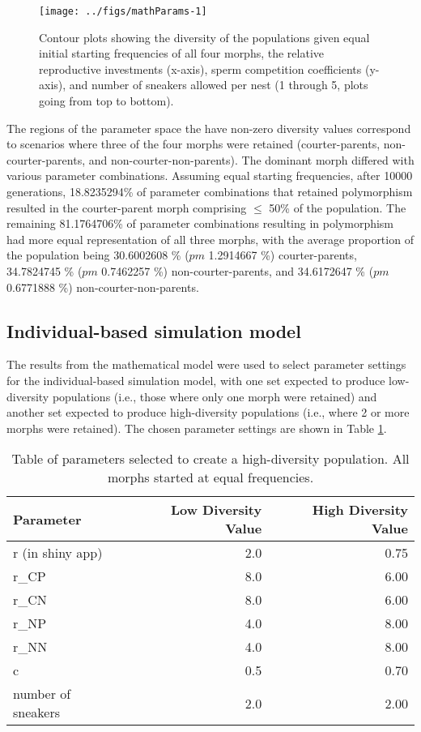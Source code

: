 \documentclass[
  11pt,
]{article}
\begin{document}
\begin{figure}[H]
\texttt{[image: ../figs/mathParams-1]} \caption{Contour plots showing the diversity of the populations given equal initial starting frequencies of all four morphs, the relative reproductive investments (x-axis), sperm competition coefficients (y-axis), and number of sneakers allowed per nest (1 through 5, plots going from top to bottom).}\label{fig:mathParams}
\end{figure}

The regions of the parameter space the have non-zero diversity values
correspond to scenarios where three of the four morphs were retained
(courter-parents, non-courter-parents, and non-courter-non-parents). The
dominant morph differed with various parameter combinations. Assuming
equal starting frequencies, after 10000 generations, 18.8235294\% of
parameter combinations that retained polymorphism resulted in the
courter-parent morph comprising \(\le\) 50\% of the population. The
remaining 81.1764706\% of parameter combinations resulting in
polymorphism had more equal representation of all three morphs, with the
average proportion of the population being
30.6002608 \% (\(pm\)
1.2914667 \%) courter-parents,
34.7824745 \% (\(pm\)
0.7462257 \%) non-courter-parents, and
34.6172647 \% (\(pm\)
0.6771888 \%) non-courter-non-parents.

\hypertarget{individual-based-simulation-model-1}{%
\subsection{Individual-based simulation model}\label{individual-based-simulation-model-1}}

The results from the mathematical model were used to select parameter
settings for the individual-based simulation model, with one set
expected to produce low-diversity populations (i.e., those where only
one morph were retained) and another set expected to produce
high-diversity populations (i.e., where 2 or more morphs were retained).
The chosen parameter settings are shown in Table
\ref{tab:SimParamsTable}.

\begin{table}[H]

\caption{\label{tab:SimParamsTable}Table of parameters selected to create a high-diversity population. All morphs started at equal frequencies.}
\centering
\begin{tabular}[t]{lrr}
\toprule
Parameter & Low Diversity Value & High Diversity Value\\
\midrule
r (in shiny app) & 2.0 & 0.75\\
r\_CP & 8.0 & 6.00\\
r\_CN & 8.0 & 6.00\\
r\_NP & 4.0 & 8.00\\
r\_NN & 4.0 & 8.00\\
\addlinespace
c & 0.5 & 0.70\\
number of sneakers & 2.0 & 2.00\\
\bottomrule
\end{tabular}
\end{table}
\end{document}
